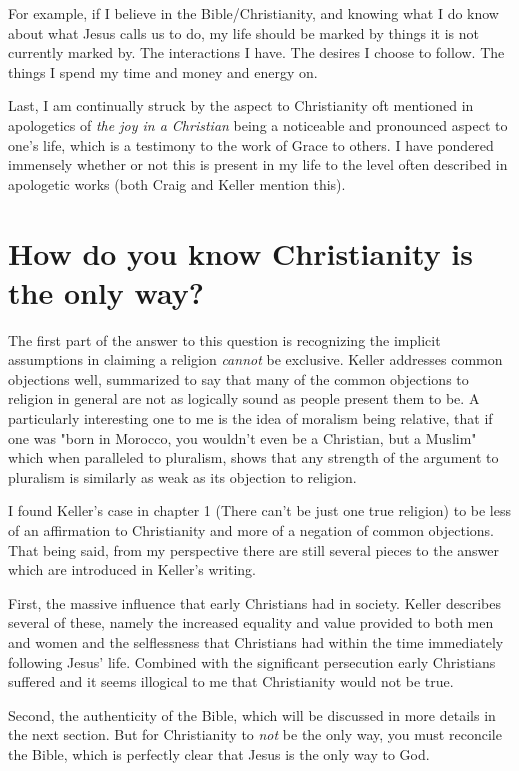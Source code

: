 \documentclass[12pt]{turabian-researchpaper}
\begin{document}
For example, if I believe in the Bible/Christianity, and knowing what I do know about what Jesus calls us to do, my life should be marked by things it is not currently marked by. The interactions I have. The desires I choose to follow. The things I spend my time and money and energy on.

Last, I am continually struck by the aspect to Christianity oft mentioned in apologetics of \textit{the joy in a Christian} being a noticeable and pronounced aspect to one's life, which is a testimony to the work of Grace to others. I have pondered immensely whether or not this is present in my life to the level often described in apologetic works (both Craig and Keller mention this).

\section{How do you know Christianity is the only way?}

The first part of the answer to this question is recognizing the implicit assumptions in claiming a religion \textit{cannot} be exclusive. Keller addresses common objections well, summarized to say that many of the common objections to religion in general are not as logically sound as people present them to be.\autocite[pg.5-17]{keller2008reason} A particularly interesting one to me is the idea of moralism being relative, that if one was "born in Morocco, you wouldn't even be a Christian, but a Muslim"\autocite[pg.11]{keller2008reason} which when paralleled to pluralism, shows that any strength of the argument to pluralism is similarly as weak as its objection to religion.

I found Keller's case in chapter 1 (There can't be just one true religion) to be less of an affirmation to Christianity and more of a negation of common objections. That being said, from my perspective there are still several pieces to the answer which are introduced in Keller's writing.

First, the massive influence that early Christians had in society. Keller describes several of these, namely the increased equality and value provided to both men and women and the selflessness that Christians had within the time immediately following Jesus' life\autocite[pg.21]{keller2008reason}. Combined with the significant persecution early Christians suffered and it seems illogical to me that Christianity would not be true.

Second, the authenticity of the Bible, which will be discussed in more details in the next section. But for Christianity to \textit{not} be the only way, you must reconcile the Bible, which is perfectly clear that Jesus is the only way to God. 
\end{document}
